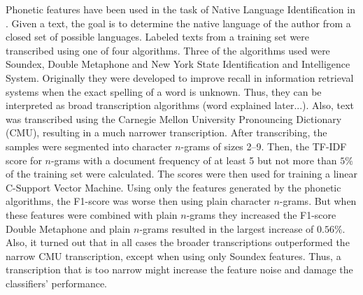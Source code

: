Phonetic features have been used in the task of Native Language Identification in \cite{smiley2017native}.
Given a text, the goal is to determine the native language of the author from a closed set of possible languages.
Labeled texts from a training set were transcribed using one of four algorithms.
Three of the algorithms used were Soundex, Double Metaphone and New York State Identification and Intelligence System.
Originally they were developed to improve recall in information retrieval systems when the exact spelling of a word is unknown.
Thus, they can be interpreted as broad transcription algorithms (word explained later...).
Also, text was transcribed using the Carnegie Mellon University Pronouncing Dictionary (CMU), resulting in a much narrower transcription.
After transcribing, the samples were segmented into character $n$-grams of sizes 2--9.
Then, the TF-IDF score for $n$-grams with a document frequency of at least 5 but not more than $5\%$ of the training set were calculated.
The scores were then used for training a linear C-Support Vector Machine.
Using only the features generated by the phonetic algorithms, the F1-score was worse then using plain character $n$-grams.
But when these features were combined with plain $n$-grams they increased the F1-score
Double Metaphone and plain $n$-grams resulted in the largest increase of $0.56\%$.
Also, it turned out that in all cases the broader transcriptions outperformed the narrow CMU transcription, except when using only Soundex features.
Thus, a transcription that is too narrow might increase the feature noise and damage the classifiers' performance.